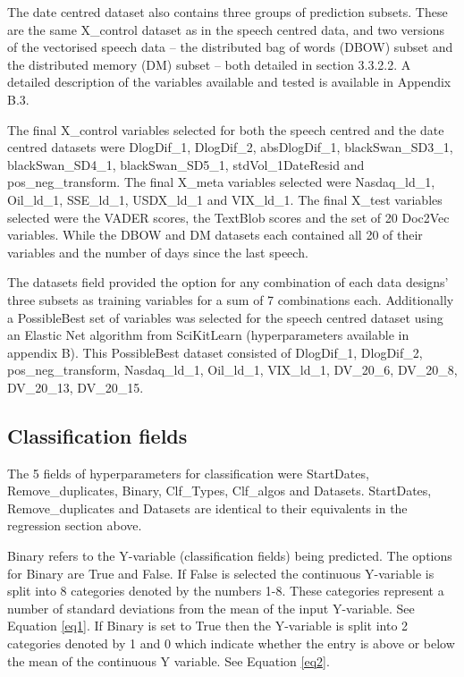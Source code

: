 \documentclass[11pt,preprint, authoryear]{elsarticle}
\numberwithin{equation}{section}
\numberwithin{figure}{section}
\numberwithin{table}{section}
\begin{document}
The date centred dataset also contains three groups of prediction
subsets. These are the same X\_control dataset as in the speech centred
data, and two versions of the vectorised speech data -- the distributed
bag of words (DBOW) subset and the distributed memory (DM) subset --
both detailed in section 3.3.2.2. A detailed description of the
variables available and tested is available in Appendix B.3.

The final X\_control variables selected for both the speech centred and
the date centred datasets were DlogDif\_1, DlogDif\_2, absDlogDif\_1,
blackSwan\_SD3\_1, blackSwan\_SD4\_1, blackSwan\_SD5\_1,
stdVol\_1DateResid and pos\_neg\_transform. The final X\_meta variables
selected were Nasdaq\_ld\_1, Oil\_ld\_1, SSE\_ld\_1, USDX\_ld\_1 and
VIX\_ld\_1. The final X\_test variables selected were the VADER scores,
the TextBlob scores and the set of 20 Doc2Vec variables. While the DBOW
and DM datasets each contained all 20 of their variables and the number
of days since the last speech.

The datasets field provided the option for any combination of each data
designs' three subsets as training variables for a sum of 7 combinations
each. Additionally a PossibleBest set of variables was selected for the
speech centred dataset using an Elastic Net algorithm from SciKitLearn
(hyperparameters available in appendix B). This PossibleBest dataset
consisted of DlogDif\_1, DlogDif\_2, pos\_neg\_transform, Nasdaq\_ld\_1,
Oil\_ld\_1, VIX\_ld\_1, DV\_20\_6, DV\_20\_8, DV\_20\_13, DV\_20\_15.

\hypertarget{classification-fields}{%
\subsection{Classification fields}\label{classification-fields}}

The 5 fields of hyperparameters for classification were StartDates,
Remove\_duplicates, Binary, Clf\_Types, Clf\_algos and Datasets.
StartDates, Remove\_duplicates and Datasets are identical to their
equivalents in the regression section above.

Binary refers to the Y-variable (classification fields) being predicted.
The options for Binary are True and False. If False is selected the
continuous Y-variable is split into 8 categories denoted by the numbers
1-8. These categories represent a number of standard deviations from the
mean of the input Y-variable. See Equation \ref{eq1}. If Binary is set
to True then the Y-variable is split into 2 categories denoted by 1 and
0 which indicate whether the entry is above or below the mean of the
continuous Y variable. See Equation \ref{eq2}.
\end{document}
